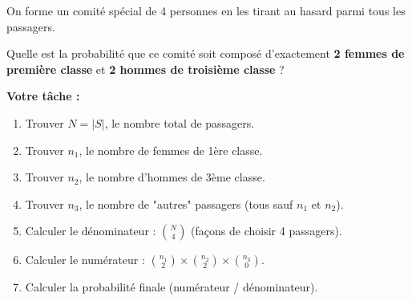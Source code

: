\begin{exercicebox}
On forme un comité spécial de 4 personnes en les tirant au hasard parmi tous les passagers.

Quelle est la probabilité que ce comité soit composé d'exactement \textbf{2 femmes de première classe} et \textbf{2 hommes de troisième classe} ?

\textbf{Votre tâche :}
\begin{enumerate}
    \item Trouver $N = |S|$, le nombre total de passagers.
    \item Trouver $n_1$, le nombre de femmes de 1ère classe.
    \item Trouver $n_2$, le nombre d'hommes de 3ème classe.
    \item Trouver $n_3$, le nombre de "autres" passagers (tous sauf $n_1$ et $n_2$).
    \item Calculer le dénominateur : $\binom{N}{4}$ (façons de choisir 4 passagers).
    \item Calculer le numérateur : $\binom{n_1}{2} \times \binom{n_2}{2} \times \binom{n_3}{0}$.
    \item Calculer la probabilité finale (numérateur / dénominateur).
\end{enumerate}
\end{exercicebox}